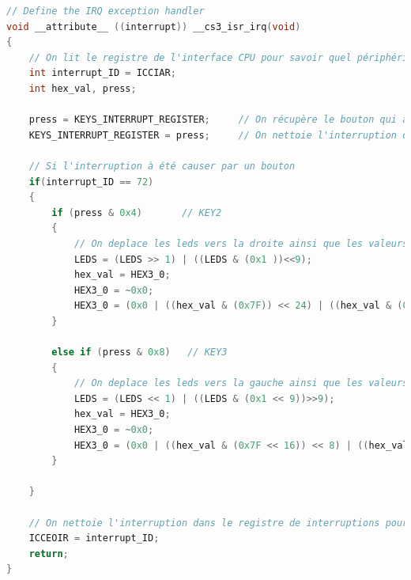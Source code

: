 \begin{lstlisting}[language=C]
// Define the IRQ exception handler
void __attribute__ ((interrupt)) __cs3_isr_irq(void)
{
	// On lit le registre de l'interface CPU pour savoir quel périphérique a causé l'interruption 
	int interrupt_ID = ICCIAR;
	int hex_val, press;
	
	press = KEYS_INTERRUPT_REGISTER;     // On récupère le bouton qui à causer l'interruption
	KEYS_INTERRUPT_REGISTER = press;     // On nettoie l'interruption dans le registre des interruptions pour les KEYS
	
	// Si l'interruption à été causer par un bouton
	if(interrupt_ID == 72)
	{
		if (press & 0x4)       // KEY2
		{
			// On deplace les leds vers la droite ainsi que les valeurs des afficheurs 7 segments
			LEDS = (LEDS >> 1) | ((LEDS & (0x1 ))<<9);
			hex_val = HEX3_0;
			HEX3_0 = ~0x0;
			HEX3_0 = (0x0 | ((hex_val & (0x7F)) << 24) | ((hex_val & (0x7F << 24)) >> 8) | ((hex_val & (0x7F << 16)) >> 8) | ((hex_val & (0x7F << 8))>>8));
		}
		
		else if (press & 0x8)	// KEY3
		{
			// On deplace les leds vers la gauche ainsi que les valeurs des afficheurs 7 segments
			LEDS = (LEDS << 1) | ((LEDS & (0x1 << 9))>>9);
			hex_val = HEX3_0;
			HEX3_0 = ~0x0;
			HEX3_0 = (0x0 | ((hex_val & (0x7F << 16)) << 8) | ((hex_val & (0x7F << 8)) << 8) | ((hex_val & (0x7F )) << 8) | ((hex_val & (0x7F << 24))>>24));
		}
	
	}
	
	// On nettoie l'interruption dans le registre de interruptions pour le processeur
	ICCEOIR = interrupt_ID;
	return;
}
\end{lstlisting}